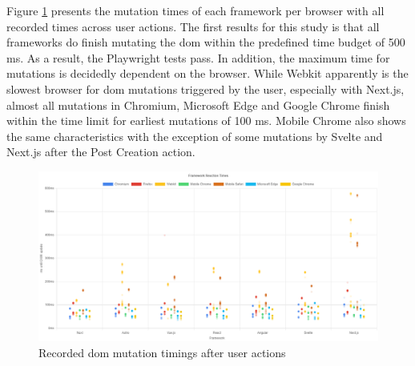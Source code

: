 \documentclass[a4paper, 10pt]{article}
\begin{document}
Figure \ref{fig:playwrightResults:total} presents the mutation times of each framework per browser with all recorded times across user actions.
The first results for this study is that all frameworks do finish mutating the \acrshort{dom} within the predefined time budget of 500 ms.
As a result, the Playwright tests pass.
In addition, the maximum time for mutations is decidedly dependent on the browser.
While Webkit apparently is the slowest browser for \acrshort{dom} mutations triggered by the user, especially with Next.js, almost all mutations in Chromium, Microsoft Edge and Google Chrome finish within the time limit for earliest mutations of 100 ms.
Mobile Chrome also shows the same characteristics with the exception of some mutations by Svelte and Next.js after the Post Creation action.

\begin{figure}[ht]
  \centering
  \includegraphics[width=\linewidth, keepaspectratio]{img/playwright-results/userActions_byUserAction/total.png}
  \caption{Recorded \acrshort{dom} mutation timings after user actions}
  \label{fig:playwrightResults:total}
\end{figure}
\end{document}
